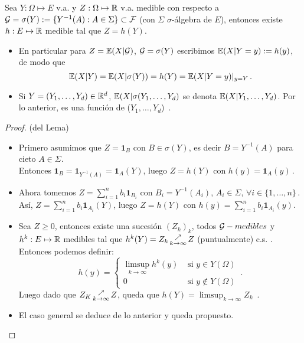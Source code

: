 \begin{lemma}
Sea $Y:\Omega\mapsto E$ v.a. y $Z:\Omega\mapsto \mathbb{R}$ v.a. medible con respecto a $\mathcal{G}=\sigma(Y):=\{Y^{-1}(A):A\in \Sigma \}\subset \mathcal{F}$ (con $\Sigma$ $\sigma$-álgebra de $E$), entonces existe $h:E\mapsto \mathbb{R}$ medible tal que $Z=h(Y)$.
\end{lemma}
\begin{remark}
\beforeitemize
\begin{itemize}
    \item En particular para $Z=\mathbb{E}(X|\mathcal{G})$, $\mathcal{G}=\sigma(Y)$ escribimos $\mathbb{E}(X|Y=y):=h(y)$, de modo que
    $$ \mathbb{E}(X|Y) = \mathbb{E}(X|\sigma(Y)) = h(Y) = \mathbb{E}(X|Y=y)|_{y=Y} \, .$$
    \item Si $Y=(Y_1,\dots,Y_d)\in\mathbb{R}^d$, $\mathbb{E}(X|\sigma(Y_1,\dots,Y_d)$ se denota $\mathbb{E}(X|Y_1,\dots,Y_d)$. Por lo anterior, es una función de ($Y_1,\dots,Y_d$)\, .
\end{itemize}
\end{remark}
\begin{proof}
(del Lema)

\begin{itemize} \gris
    \item Primero asumimos que $Z=\mathbf{1}_B$ con $B\in\sigma(Y)$, es decir $B=Y^{-1}(A)$ para cieto  $A\in\Sigma$. \\ Entonces $\mathbf{1}_B=\mathbf{1}_{Y^{-1}(A)}=\mathbf{1}_A(Y)$, luego $Z=h(Y)$ con $h(y)=\mathbf{1}_A(y) \, .$
    \item Ahora tomemos $Z=\displaystyle \sum^n_{i=1}b_i\mathbf{1}_{B_i}$ con $B_i=Y^{-1}(A_i)$, $A_i\in\Sigma$, $\forall i\in\{1,\dots,n\} \, .$
    \\ As\'i,  $Z=\displaystyle \sum^n_{i=1}b_i\mathbf{1}_{A_i}(Y)$, luego $Z=h(Y)$ con $h(y)=\displaystyle\sum^n_{i=1}b_i\mathbf{1}_{A_i}(y)$.
    \item Sea $Z\geq 0$, entonces existe una sucesión $(Z_k)_k$, todos $\mathcal{G}-medibles$ y $h^k:E\mapsto\mathbb{R}$ medibles tal que $h^k(Y)=Z_k \displaystyle \,\substack{\nearrow \\ \tiny{k\to\infty}}\, Z$ (puntualmente) c.s. . Entonces podemos definir:
    $$ h(y) = \begin{cases} \displaystyle\limsup_{k\to \infty}h^k(y)  & \mbox{ si }y\in Y(\Omega)\\
                            0 & \mbox{ si }y\notin Y(\Omega)  \end{cases} \, .$$
    Luego dado que $Z_K \,\substack{\nearrow \\ \tiny{k\to\infty}}\, Z$, queda que $h(Y)=\displaystyle\limsup_{k\to \infty}Z_k$\, . %
    \item El caso general se deduce de lo anterior y  queda propuesto.
\end{itemize} \findem \negro
\end{proof}
